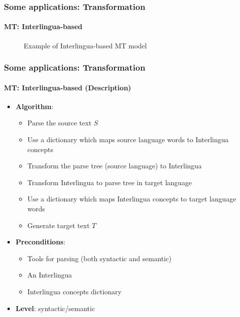 \documentclass[xcolor=table]{beamer}
\begin{document}
\begin{frame}
	\frametitle{Some applications: Transformation}
	\framesubtitle{MT: Interlingua-based}
	
	\begin{figure}
		\centering
		\caption{Example of Interlingua-based MT model \cite{06-quah}}
	\end{figure}

\end{frame}

\begin{frame}
	\frametitle{Some applications: Transformation}
	\framesubtitle{MT: Interlingua-based (Description)}
	\begin{itemize}
		\item \textbf{Algorithm}:
		\begin{itemize}
			\item Parse the source text $S$
			\item Use a dictionary which maps source language words to Interlingua concepts 
			\item Transform the parse tree (source language) to Interlingua
			\item Transform Interlingua to parse tree in target language
			\item Use a dictionary which maps Interlingua concepts to target language words 
			\item Generate target text $T$
		\end{itemize}
		\item \textbf{Preconditions}:
		\begin{itemize}
			\item Tools for parsing (both syntactic and semantic)
			\item An Interlingua
			\item Interlingua concepts dictionary
		\end{itemize}
		\item \textbf{Level}: syntactic/semantic
	\end{itemize}
\end{frame}
\end{document}
